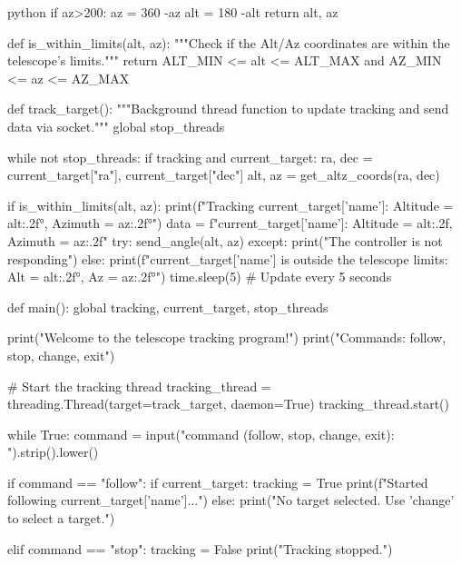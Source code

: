 \begin{appendixs}
\begin{sourcecode}[]{python}{}
        if az>200:
            az = 360 -az
            alt = 180 -alt
        return alt, az
    
    
    def is_within_limits(alt, az):
        """Check if the Alt/Az coordinates are within the telescope's limits."""
        return ALT_MIN <= alt <= ALT_MAX and AZ_MIN <= az <= AZ_MAX
    
    
    def track_target():
        """Background thread function to update tracking and send data via socket."""
        global stop_threads
    
        while not stop_threads:
            if tracking and current_target:
                ra, dec = current_target["ra"], current_target["dec"]
                alt, az = get_altz_coords(ra, dec)
    
                if is_within_limits(alt, az):
                    print(f"Tracking {current_target['name']}: Altitude = {alt:.2f}°, Azimuth = {az:.2f}°")
                    data = f"{current_target['name']}: Altitude = {alt:.2f}, Azimuth = {az:.2f}\n"
                    try:
                        send_angle(alt, az)
                    except:
                        print("The controller is not responding")
                else:
                    print(f"{current_target['name']} is outside the telescope limits: Alt = {alt:.2f}°, Az = {az:.2f}°")
            time.sleep(5)  # Update every 5 seconds
    
    
    
    def main():
        global tracking, current_target, stop_threads
    
        print("Welcome to the telescope tracking program!")
        print("Commands: follow, stop, change, exit")
    
        # Start the tracking thread
        tracking_thread = threading.Thread(target=track_target, daemon=True)
        tracking_thread.start()
    
        while True:
            command = input("\nEnter command (follow, stop, change, exit): ").strip().lower()
    
            if command == "follow":
                if current_target:
                    tracking = True
                    print(f"Started following {current_target['name']}...")
                else:
                    print("No target selected. Use 'change' to select a target.")
    
            elif command == "stop":
                tracking = False
                print("Tracking stopped.")
    

\end{sourcecode}
\end{appendixs}
